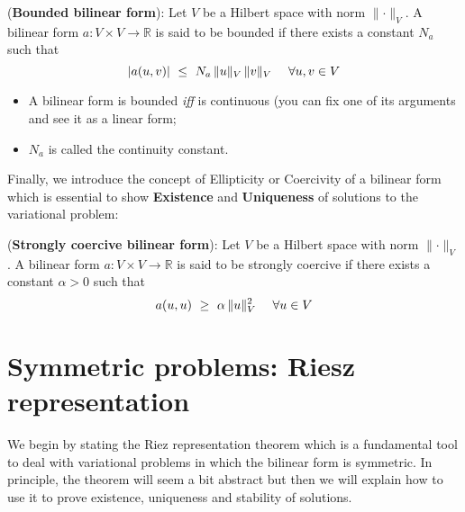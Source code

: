 \begin{definition}  
(\textbf{Bounded bilinear form}): Let $V$ be a Hilbert space
with norm $\lVert \cdot \rVert_V$. A bilinear form
$a: V \times V \rightarrow \mathbb{R}$ is said to be
bounded if there exists a constant $N_{a}$ such that
\begin{equation}
|a(u,v)| ~\le~ N_a \, \lVert u \rVert_V \,\lVert v \rVert_V~~~~\forall u,v \in V \labeq{boundbilin}
\end{equation}
\end{definition}

\begin{itemize}
\item A bilinear form is bounded \emph{iff} is continuous (you
can fix one of its arguments and see it as a linear form;\\
\item $N_a$ is called the continuity constant.
\end{itemize}

Finally, we introduce the concept of Ellipticity or Coercivity of
a bilinear form which is essential to show \textbf{Existence}
and \textbf{Uniqueness} of solutions to the variational problem:

\begin{definition}  
(\textbf{Strongly coercive bilinear form}): Let $V$ be a Hilbert space
with norm $\lVert \cdot \rVert_V$. A bilinear form
$a: V \times V \rightarrow \mathbb{R}$ is said to be
strongly coercive if there exists a constant $\alpha > 0$ such that
\begin{equation}
a(u,u) ~\ge~ \alpha \, \lVert u \rVert^2_V~~~~\forall u \in V \labeq{coercbilin}
\end{equation}
\end{definition}


\section{Symmetric problems: Riesz representation}

We begin by stating the Riez representation theorem which is a fundamental
tool to deal with variational problems in which the bilinear form is symmetric.
In principle, the theorem will seem a bit abstract but then we
will explain how to use it to prove existence, uniqueness and
stability of solutions.

